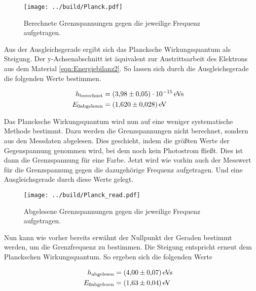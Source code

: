 \begin{figure}[H]
    \centering
    \texttt{[image: ../build/Planck.pdf]}
    \caption{Berechnete Grenzspannungen gegen die jeweilige Frequenz aufgetragen.}
    \label{fig:Planck}
\end{figure}

\noindent Aus der Ausgleichsgerade ergibt sich das Plancksche Wirkungsquantum als Steigung. Der y-Achsenabschnitt ist äquivalent zur 
Austrittsarbeit des Elektrons aus dem Material \ref{eqn:Energiebilanz2}. So lassen sich durch die Ausgleichsgerade die folgenden Werte 
bestimmen.

\begin{align}
    h_\text{berechnet} &=\qty{3.98\pm0.05 e-15}{e \volt \second} \\
    E_{0 \text{abgelesen}} &= \qty{1.620 \pm 0.028}{e \volt}
\end{align}

\noindent Das Plancksche Wirkungsquantum wird nun auf eine weniger systematische Methode bestimmt. Dazu werden die Grenzspannungen nicht 
berechnet, sondern aus den Messdaten abgelesen. Dies geschieht, indem die größten Werte der Gegenspannung genommen wird, bei dem noch kein 
Photostrom fließt. Dies ist dann die Grenzspannung für eine Farbe. Jetzt wird wie vorhin auch der Messwert für die Grenzspannung gegen die 
dazugehörige Frequenz aufgetragen. Und eine Ausgleichsgerade durch diese Werte gelegt.

\begin{figure}
    \centering
    \texttt{[image: ../build/Planck\_read.pdf]}
    \caption{Abgelesene Grenzspannungen gegen die jeweilige Frequenz aufgetragen.}
    \label{fig:Planck_read}
\end{figure}

\noindent Nun kann wie vorher bereits erwähnt der Nullpunkt der Geraden bestimmt werden, um die Grenzfrequenz zu bestimmen. Die Steigung 
entspricht erneut dem Planckschen Wirkungsquantum. So ergeben sich die folgenden Werte

\begin{align}
    h_\text{abgelesen} &= \qty{4.00 \pm 0.07}{e \volt \second}\\
    E_{0 \text{abgelesen}} &= \qty{1.63 \pm 0.04}{e \volt}
\end{align}


















